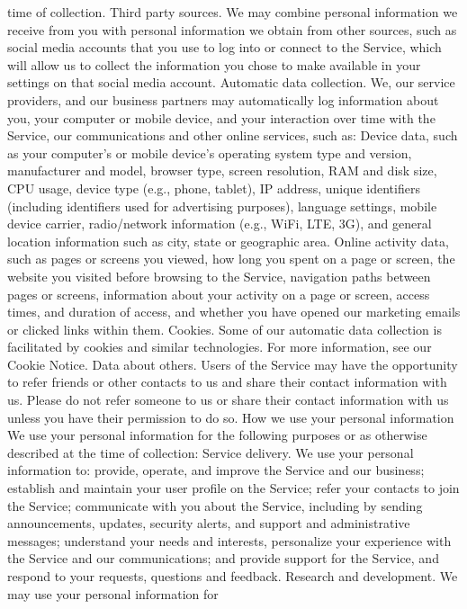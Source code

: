 time of collection.
Third party sources. We may combine personal information we receive
from you with personal information we obtain from other sources, such
as social media accounts that you use to log into or connect to the
Service, which will allow us to collect the information you chose to make
available in your settings on that social media account.
Automatic data collection. We, our service providers, and our business
partners may automatically log information about you, your computer or
mobile device, and your interaction over time with the Service, our
communications and other online services, such as:
Device data, such as your computer’s or mobile device’s operating
system type and version, manufacturer and model, browser type,
screen resolution, RAM and disk size, CPU usage, device type (e.g.,
phone, tablet), IP address, unique identifiers (including identifiers
used for advertising purposes), language settings, mobile device
carrier, radio/network information (e.g., WiFi, LTE, 3G), and general
location information such as city, state or geographic area.
Online activity data, such as pages or screens you viewed, how
long you spent on a page or screen, the website you visited before
browsing to the Service, navigation paths between pages or
screens, information about your activity on a page or screen,
access times, and duration of access, and whether you have
opened our marketing emails or clicked links within them.
Cookies. Some of our automatic data collection is facilitated by cookies
and similar technologies. For more information, see our Cookie Notice.
Data about others. Users of the Service may have the opportunity to
refer friends or other contacts to us and share their contact information
with us. Please do not refer someone to us or share their contact
information with us unless you have their permission to do so.
How we use your personal
information
We use your personal information for the following purposes or as
otherwise described at the time of collection:
Service delivery. We use your personal information to:
provide, operate, and improve the Service and our business;
establish and maintain your user profile on the Service;
refer your contacts to join the Service;
communicate with you about the Service, including by sending
announcements, updates, security alerts, and support and
administrative messages;
understand your needs and interests, personalize your experience
with the Service and our communications; and
provide support for the Service, and respond to your requests,
questions and feedback.
Research and development. We may use your personal information for
